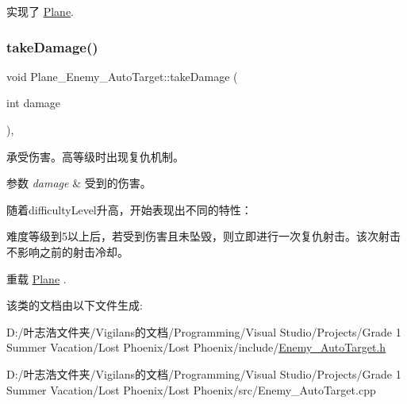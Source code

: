 实现了 \hyperlink{class_plane}{Plane}.

\mbox{\label{class_plane___enemy___auto_target_a1f9400c23995c6ac67fe04309f98cf29}} 
\subsubsection{\texorpdfstring{take\+Damage()}{takeDamage()}}
{\footnotesize\ttfamily void Plane\+\_\+\+Enemy\+\_\+\+Auto\+Target\+::take\+Damage (\begin{DoxyParamCaption}\item[{int}]{damage }\end{DoxyParamCaption})\hspace{0.3cm}{\ttfamily [override]}, {\ttfamily [virtual]}}



承受伤害。高等级时出现复仇机制。 


\begin{DoxyParams}{参数}
{\em damage} & 受到的伤害。 \\
\hline
\end{DoxyParams}


随着difficulty\+Level升高，开始表现出不同的特性：
\begin{DoxyItemize}
\item 难度等级到5以上后，若受到伤害且未坠毁，则立即进行一次复仇射击。该次射击不影响之前的射击冷却。 
\end{DoxyItemize}

重载 \hyperlink{class_plane}{Plane} .



该类的文档由以下文件生成\+:\begin{DoxyCompactItemize}
\item 
D\+:/叶志浩文件夹/\+Vigilans的文档/\+Programming/\+Visual Studio/\+Projects/\+Grade 1 Summer Vacation/\+Lost Phoenix/\+Lost Phoenix/include/\hyperlink{_enemy___auto_target_8h}{Enemy\+\_\+\+Auto\+Target.\+h}\item 
D\+:/叶志浩文件夹/\+Vigilans的文档/\+Programming/\+Visual Studio/\+Projects/\+Grade 1 Summer Vacation/\+Lost Phoenix/\+Lost Phoenix/src/Enemy\+\_\+\+Auto\+Target.\+cpp\end{DoxyCompactItemize}
